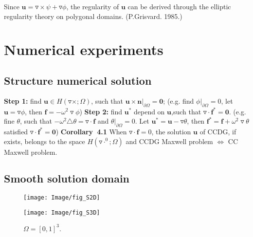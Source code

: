 \documentclass[a4paper,11pt]{article}
\begin{document}
Since $\mathbf{u} = \triangledown\times\psi + \triangledown\phi$, the regularity of $\mathbf{u}$ can be derived through the elliptic
regularity theory on polygonal domains. (P.Grisvard. 1985.)

\newpage
\section{Numerical experiments}
\subsection{Structure numerical solution}
\textbf{Step 1:} find $\mathbf{u}\in H(\triangledown\times;\Omega)$, such that $\mathbf{u}\times\mathbf{n}|_{\partial\Omega} = \mathbf{0}$;\newline
\indent\indent (e.g. find $\phi|_{\partial\Omega} = 0$, let $\mathbf{u} = \triangledown\phi$, then $\mathbf{f} = -\omega^2\triangledown\phi$)
\newline\textbf{Step 2:} find $\mathbf{u}^{*}$ depend on $\mathbf{u}$,such that $\triangledown\cdot\mathbf{f}^* = \mathbf{0}$.\newline
\indent\indent (e.g. fine $\theta$, such that $-\omega^2\triangle\theta = \triangledown\cdot\mathbf{f}$ and $\theta|_{\partial\Omega} = 0$. Let $\mathbf{u}^{*} = \mathbf{u} - \triangledown{\theta}$, then $\mathbf{f}^{*} = \mathbf{f} + \omega^2\triangledown\theta$ satisfied $\triangledown\cdot\mathbf{f}^* = \mathbf{0}$)
\newline\textbf{Corollary\ 4.1}  When $\triangledown\cdot\mathbf{f} = 0$, the solution $\mathbf{u}$ of CCDG, if exists, belongs to
the space $H(\triangledown\cdot^0;\Omega)$ and CCDG Maxwell problem  $\Leftrightarrow$ CC Maxwell problem.

\subsection{Smooth solution domain}
\begin{figure}[bhpt]
  \hspace{-5.pt}
  \begin{minipage}[b]{0.5 \textwidth}
    \centering
    \texttt{[image: Image/fig\_S2D]}\\
    \caption{$\Omega = [0,1]^2$.}\label{fig:fig_S2D}
  \end{minipage}
  \hspace{-0.2in}
  \begin{minipage}[b]{0.5 \textwidth}
    \centering
    \texttt{[image: Image/fig\_S3D]}
    \caption{$\Omega = [0,1]^3$.}\label{fig:fig_S3D}
  \end{minipage}
\end{figure}
\end{document}
